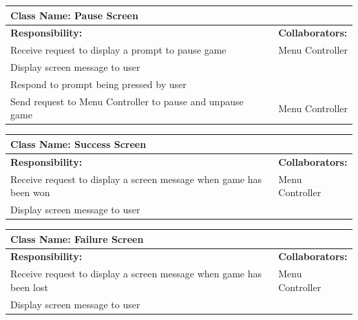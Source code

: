 \documentclass[12pt, titlepage]{article}
\begin{document}
\begin{enumerate}[a)]
	\begin{table}[H]
		\centering
		\begin{tabular}{|p{5cm}|p{5cm}|}
		\hline 
		 \multicolumn{2}{|l|}{\textbf{Class Name: Pause Screen}} \\
		\hline
		\textbf{Responsibility:} & \textbf{Collaborators:} \\
		\hline
		 Receive request to display a prompt to pause game& Menu Controller \\
		 Display screen message to user& \\
		 Respond to prompt being pressed by user& \\
		 Send request to Menu Controller to pause and unpause game& Menu Controller \\
		\hline
		\end{tabular}
	\end{table}
	
	\begin{table}[H]
		\centering
		\begin{tabular}{|p{5cm}|p{5cm}|}
		\hline 
		 \multicolumn{2}{|l|}{\textbf{Class Name: Success Screen}} \\
		\hline
		\textbf{Responsibility:} & \textbf{Collaborators:} \\
		\hline
		 Receive request to display a screen message when game has been won& Menu Controller \\
		 Display screen message to user& \\
		\hline
		\end{tabular}
	\end{table}
	
	\begin{table}[H]
		\centering
		\begin{tabular}{|p{5cm}|p{5cm}|}
		\hline 
		 \multicolumn{2}{|l|}{\textbf{Class Name: Failure Screen}} \\
		\hline
		\textbf{Responsibility:} & \textbf{Collaborators:} \\
		\hline
		 Receive request to display a screen message when game has been lost& Menu Controller \\
		 Display screen message to user& \\
		\hline
		\end{tabular}
	\end{table}	
	
	
\end{enumerate}

\appendix
\end{document}
